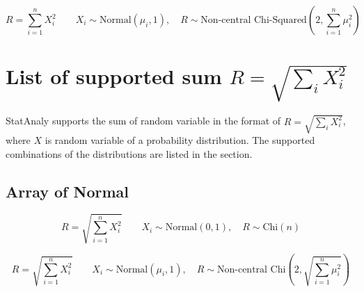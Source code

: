 \begin{equation}
    R = \sum_{i=1}^n X_i^2 \qquad 
    X_i \sim \text{Normal}(\mu_i,1), \quad 
    R \sim \text{Non-central Chi-Squared}\left(2, \sum _{i=1}^{n}\mu _{i}^2\right)
\end{equation}


\section{List of supported sum $R = \sqrt{\sum_i X_i^2}$}

StatAnaly supports the sum of random variable in the format of $R = \sqrt{\sum_i X_i^2}$, where $X$ is random variable of a probability distribution.
The supported combinations of the distributions are listed in the section.

\subsection{Array of Normal}

\begin{equation}
    R = \sqrt{ \sum_{i=1}^n X_i^2 } \qquad 
    X_i \sim \text{Normal}(0,1), \quad 
    R \sim \text{Chi}\left( n \right)
\end{equation}

\begin{equation}
    R = \sqrt{ \sum_{i=1}^n X_i^2 } \qquad 
    X_i \sim \text{Normal}(\mu_i,1), \quad 
    R \sim \text{Non-central Chi} \left( 2, \sqrt{\sum _{i=1}^{n}\mu _{i}^2} \right)
\end{equation}



